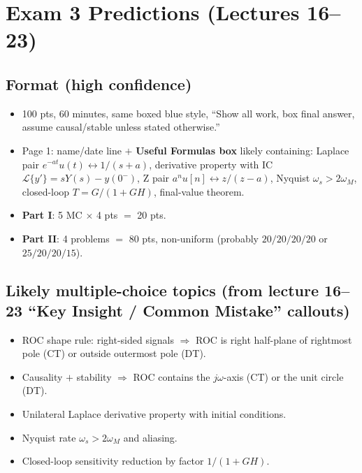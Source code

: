 \documentclass[11pt]{article}
\begin{document}
\section{Exam 3 Predictions (Lectures 16--23)}

\subsection*{Format (high confidence)}
\begin{itemize}[leftmargin=*]
    \item 100 pts, 60 minutes, same boxed blue style, ``Show all work, box final answer, assume causal/stable unless stated otherwise.''
    \item Page 1: name/date line $+$ \textbf{Useful Formulas box} likely containing: Laplace pair $e^{-at}u(t)\leftrightarrow 1/(s+a)$, derivative property with IC $\mathcal{L}\{y'\}=sY(s)-y(0^-)$, Z pair $a^n u[n]\leftrightarrow z/(z-a)$, Nyquist $\omega_s>2\omega_M$, closed-loop $T=G/(1+GH)$, final-value theorem.
    \item \textbf{Part I}: 5 MC $\times$ 4 pts $=$ 20 pts.
    \item \textbf{Part II}: 4 problems $=$ 80 pts, non-uniform (probably $20/20/20/20$ or $25/20/20/15$).
\end{itemize}

\subsection*{Likely multiple-choice topics (from lecture 16--23 ``Key Insight / Common Mistake'' callouts)}
\begin{itemize}[leftmargin=*]
    \item ROC shape rule: right-sided signals $\Rightarrow$ ROC is right half-plane of rightmost pole (CT) or outside outermost pole (DT).
    \item Causality $+$ stability $\Rightarrow$ ROC contains the $j\omega$-axis (CT) or the unit circle (DT).
    \item Unilateral Laplace derivative property with initial conditions.
    \item Nyquist rate $\omega_s > 2\omega_M$ and aliasing.
    \item Closed-loop sensitivity reduction by factor $1/(1+GH)$.
\end{itemize}
\end{document}
